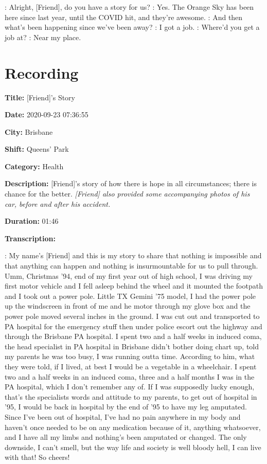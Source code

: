 {\begin{drama}
    \volspeaks: Alright, [Friend], do you have a story for us?
    \friendspeaks: Yes. The Orange Sky has been here since last year, until the COVID hit, and they're awesome.
    \volspeaks: And then what's been happening since we've been away?
    \friendspeaks: I got a job.
    \volspeaks: Where'd you get a job at?
    \friendspeaks: Near my place.
\end{drama}

\tocless\section{Recording }

\textbf{Title:} [Friend]'s Story

\textbf{Date:} 2020-09-23 07:36:55

\textbf{City:} Brisbane

\textbf{Shift:} Queens' Park

\textbf{Category:} Health

\textbf{Description:} [Friend]'s story of how there is hope in all circumstances; there is chance for the better. \emph{[Friend] also provided some accompanying photos of his car, before and after his accident.}

\textbf{Duration:} 01:46

\textbf{Transcription:}

\begin{drama}

    \friendspeaks: My name's [Friend] and this is my story to share that nothing is impossible and that anything can happen and nothing is insurmountable for us to pull through. Umm, Christmas '94, end of my first year out of high school, I was driving my first motor vehicle and I fell asleep behind the wheel and it mounted the footpath and I took out a power pole. Little TX Gemini '75 model, I had the power pole up the windscreen in front of me and he motor through my glove box and the power pole moved several inches in the ground. I was cut out and transported to PA hospital for the emergency stuff then under police escort out the highway and through the Brisbane PA hospital. I spent two and a half weeks in induced coma, the head specialist in PA hospital in Brisbane didn't bother doing chart up, told my parents he was too busy, I was running outta time. According to him, what they were told, if I lived, at best I would be a vegetable in a wheelchair. I spent two and a half weeks in an induced coma, three and a half months I was in the PA hospital, which I don't remember any of. If I was supposedly lucky enough, that's the specialists words and attitude to my parents, to get out of hospital in '95, I would be back in hospital by the end of '95 to have my leg amputated. Since I've been out of hospital, I've had no pain anywhere in my body and haven't once needed to be on any medication because of it, anything whatsoever, and I have all my limbs and nothing's been amputated or changed. The only downside, I can't smell, but the way life and society is well bloody hell, I can live with that! So cheers!
\end{drama}

}
